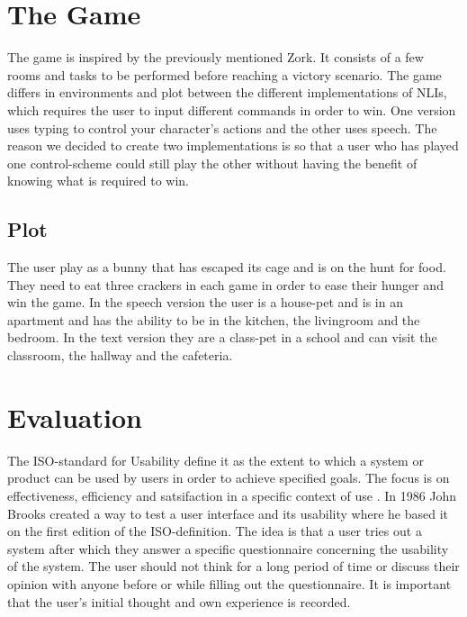 \section{The Game}
The game is inspired by the previously mentioned Zork. It consists of a few rooms and tasks to be performed before reaching a victory scenario. The game differs in environments and plot between the different implementations of NLIs, which requires the user to input different commands in order to win. One version uses typing to control your character’s actions and the other uses speech. The reason we decided to create two implementations is so that a user who has played one control-scheme could still play the other without having the benefit of knowing what is required to win.

\subsection{Plot}
The user play as a bunny that has escaped its cage and is on the hunt for food. They need to eat three crackers in each game in order to ease their hunger and win the game. In the speech version the user is a house-pet and is in an apartment and has the ability to be in the kitchen, the livingroom and the bedroom. In the text version they are a class-pet in a school and can visit the classroom, the hallway and the cafeteria.

\section{Evaluation}
The ISO-standard for Usability define it as the extent to which a system or product can be used by users in order to achieve specified goals. The focus is on effectiveness, efficiency and satsifaction in a specific context of use \citep{ISO}. In 1986 John Brooks created a way to test a user interface and its usability where he based it on the first edition of the ISO-definition. The idea is that a user tries out a system after which they answer a specific questionnaire concerning the usability of the system. The user should not think for a long period of time or discuss their opinion with anyone before or while filling out the questionnaire. It is important that the user’s initial thought and own experience is recorded. \citep{Broo}


